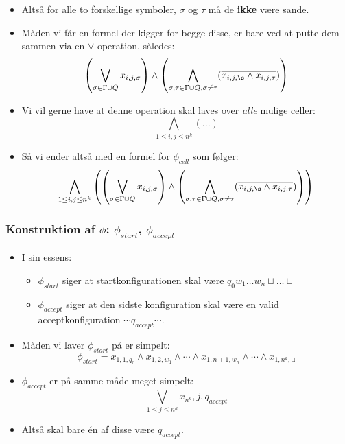 \begin{frame}[allowframebreaks]
\begin{itemize}
	  \item Altså for alle to forskellige symboler, \(\sigma\) og \(\tau\) må de \textbf{ikke} være sande.
	  \item Måden vi får en formel der kigger for begge disse, er bare ved at putte dem sammen via en $\lor$ operation, således:
			\begin{equation}
\left(  \bigvee_{\sigma \in \Gamma \cup Q} x_{i,j,\sigma} \right) \land \left(    \bigwedge_{\sigma, \tau \in \Gamma \cup Q, \sigma \ne \tau} (\overline{x_{i,j,\s} \land x_{i,j,\tau}}) \right)
			\end{equation}
	  \item Vi vil gerne have at denne operation skal laves over \textit{alle} mulige celler:
			\begin{equation}
\bigwedge_{1 \le i,j \le n^{k}} \left( ... \right)
			\end{equation}
	  \item Så vi ender altså med en formel for \(\phi_{cell}\) som følger:
			\begin{equation}
			  \bigwedge_{1 \le i,j \le n^{k}} \left(
\left(  \bigvee_{\sigma \in \Gamma \cup Q} x_{i,j,\sigma} \right) \land \left(    \bigwedge_{\sigma, \tau \in \Gamma \cup Q, \sigma \ne \tau} (\overline{x_{i,j,\s} \land x_{i,j,\tau}}) \right)
			  \right)
			\end{equation}
	\end{itemize}
\end{frame}

\begin{frame}
  \frametitle{Konstruktion af \(\phi\): \(\phi_{start}\), \(\phi_{accept}\)}
\begin{itemize}
  \item I sin essens:
		\begin{itemize}
		  \item \(\phi_{start}\) siger at startkonfigurationen skal være $q_{0}w_{1}\ldots w_{n} \sqcup \ldots \sqcup$
		  \item \(\phi_{accept}\) siger at den sidste konfiguration skal være en valid acceptkonfiguration $ \cdots q_{accept} \cdots$.
		\end{itemize}

  \item Måden vi laver \(\phi_{start}\) på er simpelt:
		\begin{equation}
\phi_{start} = x_{1,1,q_{0}} \wedge x_{1,2,w_{1}} \wedge \cdots \wedge x_{1,n+1,w_{n}} \wedge \cdots \wedge x_{1,n^{k}, \sqcup}
		\end{equation}
  \item \(\phi_{accept}\) er på samme måde meget simpelt:
		\begin{equation}
\bigvee_{1 \le j \le n^{k}} x_{n^{k}},j,q_{accept}
		\end{equation}

  \item Altså skal bare én af disse være $q_{accept}$.
\end{itemize}
\end{frame}

